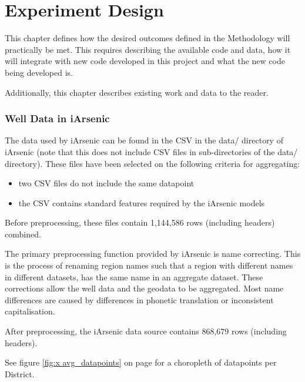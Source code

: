 \chapter{Experiment Design}

This chapter defines how the desired outcomes defined in the Methodology will practically be met. This requires describing the available code and data, how it will integrate with new code developed in this project and what the new code being developed is.

Additionally, this chapter describes existing work and data to the reader.

\subsection{Well Data in iArsenic}

The data used by iArsenic can be found in the CSV in the data/ directory of iArsenic (note that this does not include CSV files in sub-directories of the data/ directory). These files have been selected on the following criteria for aggregating:

\begin{itemize}
    \item two CSV files do not include the same datapoint
    \item the CSV contains standard features required by the iArsenic models
\end{itemize}

Before preprocessing, these files contain 1,144,586 rows (including headers) combined.

The primary preprocessing function provided by iArsenic is name correcting. This is the process of renaming region names such that a region with different names in different datasets, has the same name in an aggregate dataset. These corrections allow the well data and the geodata to be aggregated. Most name differences are caused by differences in phonetic translation or inconsistent capitalisation.

After preprocessing, the iArsenic data source contains 868,679 rows (including headers).

See figure \ref{fig:x avg_datapoints} on page \pageref{fig:x avg_datapoints} for a choropleth of datapoints per District.

